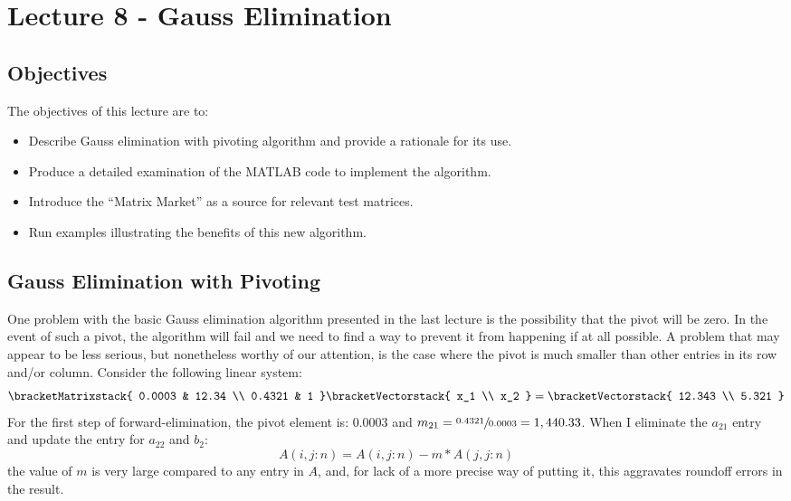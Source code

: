 \chapter{Lecture 8 - Gauss Elimination}
\label{ch:lec8n}
\section{Objectives}
The objectives of this lecture are to:
\begin{itemize}
\item Describe Gauss elimination with pivoting algorithm and provide a rationale for its use.
\item Produce a detailed examination of the MATLAB code to implement the algorithm.
\item Introduce the ``Matrix Market'' as a source for relevant test matrices.
\item Run examples illustrating the benefits of this new algorithm.
\end{itemize}
\setcounter{lstannotation}{0}

\section{Gauss Elimination with Pivoting}

One problem with the basic Gauss elimination algorithm presented in the last lecture is the possibility that the pivot will be zero.  In the event of such a pivot, the algorithm will fail and we need to find a way to prevent it from happening if at all possible.  A problem that may appear to be less serious, but nonetheless worthy of our attention, is the case where the pivot is much smaller than other entries in its row and/or column.  Consider the following linear system:
\begin{equation*}
\bracketMatrixstack{
0.0003 & 12.34 \\
0.4321 & 1 
}
\bracketVectorstack{
x_1 \\
x_2
}
=
\bracketVectorstack{
12.343 \\
5.321
}
\end{equation*}   
For the first step of forward-elimination, the pivot element is: 0.0003 and $m_{21} = \sfrac{0.4321}{0.0003} = 1,440.33$.  When I eliminate the $a_{21}$ entry and update the entry for $a_{22}$ and $b_2$:
\begin{equation*}
A(i,j:n) = A(i,j:n) - m*A(j,j:n)
\end{equation*}
the value of $m$ is very large compared to any entry in $A$, and, for lack of a more precise way of putting it, this aggravates roundoff errors in the result. 

